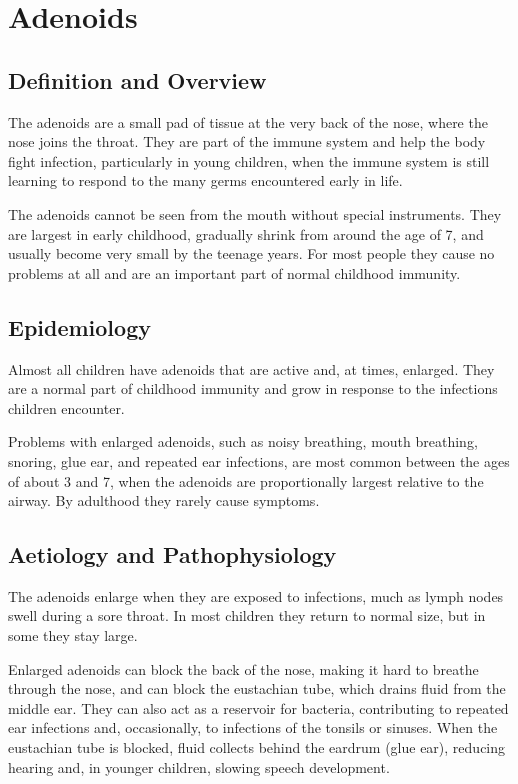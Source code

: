 \chapter{Adenoids}

\section*{Definition and Overview}
The adenoids are a small pad of tissue at the very back of the nose, where the nose joins the throat. They are part of the immune system and help the body fight infection, particularly in young children, when the immune system is still learning to respond to the many germs encountered early in life.

The adenoids cannot be seen from the mouth without special instruments. They are largest in early childhood, gradually shrink from around the age of 7, and usually become very small by the teenage years. For most people they cause no problems at all and are an important part of normal childhood immunity.

\section*{Epidemiology}
Almost all children have adenoids that are active and, at times, enlarged. They are a normal part of childhood immunity and grow in response to the infections children encounter.

Problems with enlarged adenoids, such as noisy breathing, mouth breathing, snoring, glue ear, and repeated ear infections, are most common between the ages of about 3 and 7, when the adenoids are proportionally largest relative to the airway. By adulthood they rarely cause symptoms.

\section*{Aetiology and Pathophysiology}
The adenoids enlarge when they are exposed to infections, much as lymph nodes swell during a sore throat. In most children they return to normal size, but in some they stay large.

Enlarged adenoids can block the back of the nose, making it hard to breathe through the nose, and can block the eustachian tube, which drains fluid from the middle ear. They can also act as a reservoir for bacteria, contributing to repeated ear infections and, occasionally, to infections of the tonsils or sinuses. When the eustachian tube is blocked, fluid collects behind the eardrum (glue ear), reducing hearing and, in younger children, slowing speech development.

